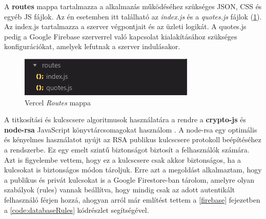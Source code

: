 A \textbf{routes} mappa tartalmazza a alkalmazás működéséhez szükséges JSON, CSS és egyéb JS fájlok. Az én esetemben itt található az \textit{index.js} és a \textit{quotes.js} fájlok (\ref{abra:vercelRoutes}). Az index.js tartalmazza a szerver végpontjait és az üzleti logikát. A quotes.js pedig a Google Firebase szerverrel való kapcsolat kialakításához szükséges konfigurációkat, amelyek lefutnak a szerver indulásakor.

\begin{figure}[!h]
	\centering
	\includegraphics[scale=0.8]{images/vercelRoutes}
	\caption{Vercel \textit{Routes} mappa}
	\label{abra:vercelRoutes}
\end{figure}

A titkosítási és kulcscsere algoritmusok használatára a rendre a \textbf{crypto-js} és \textbf{node-rsa} JavaScript könyvtárcsomagokat használom \cite{NRSA} \cite{CJS}. A node-rsa egy optimális és kényelmes használatot nyújt az RSA publikus kulcscsere protokoll beépítéséhez a rendszerbe. Ez egy emelt szintű biztonságot biztosít a felhasználók számára. Azt is figyelembe vettem, hogy ez a kulcscsere csak akkor biztonságos, ha a kulcsokat is biztonságos módon tároljuk. Erre azt a megoldást alkalmaztam, hogy a publikus és privát kulcsokat is a Google Firestore-ban tárolom, amelyre olyan szabályok (rules) vannak beállítva, hogy mindig csak az adott autentikált felhasználó férjen hozzá, ahogyan arról már említést tettem a \ref{firebase} fejezetben a \ref{code:databaseRules} kódrészlet segítségével.